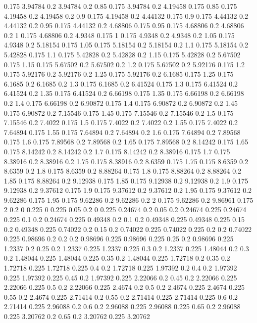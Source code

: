 0.175 3.94784
0.2 3.94784
0.2 0.85
0.175 3.94784
0.2 4.19458
0.175 0.85
0.175 4.19458
0.2 4.19458
0.2 0.9
0.175 4.19458
0.2 4.44132
0.175 0.9
0.175 4.44132
0.2 4.44132
0.2 0.95
0.175 4.44132
0.2 4.68806
0.175 0.95
0.175 4.68806
0.2 4.68806
0.2 1
0.175 4.68806
0.2 4.9348
0.175 1
0.175 4.9348
0.2 4.9348
0.2 1.05
0.175 4.9348
0.2 5.18154
0.175 1.05
0.175 5.18154
0.2 5.18154
0.2 1.1
0.175 5.18154
0.2 5.42828
0.175 1.1
0.175 5.42828
0.2 5.42828
0.2 1.15
0.175 5.42828
0.2 5.67502
0.175 1.15
0.175 5.67502
0.2 5.67502
0.2 1.2
0.175 5.67502
0.2 5.92176
0.175 1.2
0.175 5.92176
0.2 5.92176
0.2 1.25
0.175 5.92176
0.2 6.1685
0.175 1.25
0.175 6.1685
0.2 6.1685
0.2 1.3
0.175 6.1685
0.2 6.41524
0.175 1.3
0.175 6.41524
0.2 6.41524
0.2 1.35
0.175 6.41524
0.2 6.66198
0.175 1.35
0.175 6.66198
0.2 6.66198
0.2 1.4
0.175 6.66198
0.2 6.90872
0.175 1.4
0.175 6.90872
0.2 6.90872
0.2 1.45
0.175 6.90872
0.2 7.15546
0.175 1.45
0.175 7.15546
0.2 7.15546
0.2 1.5
0.175 7.15546
0.2 7.4022
0.175 1.5
0.175 7.4022
0.2 7.4022
0.2 1.55
0.175 7.4022
0.2 7.64894
0.175 1.55
0.175 7.64894
0.2 7.64894
0.2 1.6
0.175 7.64894
0.2 7.89568
0.175 1.6
0.175 7.89568
0.2 7.89568
0.2 1.65
0.175 7.89568
0.2 8.14242
0.175 1.65
0.175 8.14242
0.2 8.14242
0.2 1.7
0.175 8.14242
0.2 8.38916
0.175 1.7
0.175 8.38916
0.2 8.38916
0.2 1.75
0.175 8.38916
0.2 8.6359
0.175 1.75
0.175 8.6359
0.2 8.6359
0.2 1.8
0.175 8.6359
0.2 8.88264
0.175 1.8
0.175 8.88264
0.2 8.88264
0.2 1.85
0.175 8.88264
0.2 9.12938
0.175 1.85
0.175 9.12938
0.2 9.12938
0.2 1.9
0.175 9.12938
0.2 9.37612
0.175 1.9
0.175 9.37612
0.2 9.37612
0.2 1.95
0.175 9.37612
0.2 9.62286
0.175 1.95
0.175 9.62286
0.2 9.62286
0.2 2
0.175 9.62286
0.2 9.86961
0.175 2
0.2 0
0.225 0
0.225 0.05
0.2 0
0.225 0.24674
0.2 0.05
0.2 0.24674
0.225 0.24674
0.225 0.1
0.2 0.24674
0.225 0.49348
0.2 0.1
0.2 0.49348
0.225 0.49348
0.225 0.15
0.2 0.49348
0.225 0.74022
0.2 0.15
0.2 0.74022
0.225 0.74022
0.225 0.2
0.2 0.74022
0.225 0.98696
0.2 0.2
0.2 0.98696
0.225 0.98696
0.225 0.25
0.2 0.98696
0.225 1.2337
0.2 0.25
0.2 1.2337
0.225 1.2337
0.225 0.3
0.2 1.2337
0.225 1.48044
0.2 0.3
0.2 1.48044
0.225 1.48044
0.225 0.35
0.2 1.48044
0.225 1.72718
0.2 0.35
0.2 1.72718
0.225 1.72718
0.225 0.4
0.2 1.72718
0.225 1.97392
0.2 0.4
0.2 1.97392
0.225 1.97392
0.225 0.45
0.2 1.97392
0.225 2.22066
0.2 0.45
0.2 2.22066
0.225 2.22066
0.225 0.5
0.2 2.22066
0.225 2.4674
0.2 0.5
0.2 2.4674
0.225 2.4674
0.225 0.55
0.2 2.4674
0.225 2.71414
0.2 0.55
0.2 2.71414
0.225 2.71414
0.225 0.6
0.2 2.71414
0.225 2.96088
0.2 0.6
0.2 2.96088
0.225 2.96088
0.225 0.65
0.2 2.96088
0.225 3.20762
0.2 0.65
0.2 3.20762
0.225 3.20762

